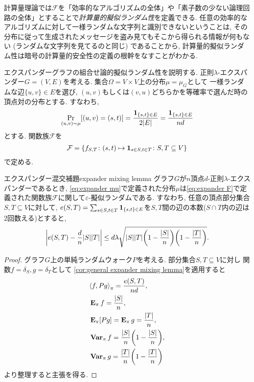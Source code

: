 計算量理論では$\mathcal{F}$を「効率的なアルゴリズムの全体」や「素子数の少ない論理回路の全体」とすることで\emph{計算量的擬似ランダム性}を定義できる.
任意の効率的なアルゴリズムに対して一様ランダムな文字列と識別できないということは, その分布に従って生成されたメッセージを盗み見てもそこから得られる情報が何もない (ランダムな文字列を見てるのと同じ) であることから, 計算量的擬似ランダム性は暗号の計算量的安全性の定義の根幹をなすことがわかる.

エクスパンダーグラフの組合せ論的擬似ランダム性を説明する.
正則$\lambda$-エクスパンダー$G=(V,E)$を考える.
集合$\Omega=V\times V$上の分布$\mu = \mu_G$として
一様ランダムな辺$\{u,v\}\in E$を選び, $(u,v)$もしくは$(v,u)$どちらかを等確率で選んだ時の頂点対の分布とする.
すなわち,
\begin{align}
    \Pr_{(u,v)\sim \mu}\sbra*{ (u,v) = (s,t)} = \frac{\indicator{\{s,t\}\in E}}{2\abs{E}} = \frac{\indicator{\{s,t\}\in E}}{nd} \label{eq:expander mu}
\end{align}
とする.
関数族$\mathcal{F}$を
\begin{align}
    \mathcal{F} = \cbra*{ f_{S,T} \colon (s,t) \mapsto \indicator{s\in S,t\in T} \colon S,T\subseteq V}  \label{eq:expander F}
\end{align}
で定める.
\begin{lemma}{エクスパンダー混交補題}{expander mixing lemma}
    グラフ$G$が$n$頂点$d$-正則$\lambda$-エクスパンダーであるとき, \cref{eq:expander mu}で定義された分布$\mu$は\cref{eq:expander F}で定義された関数族$\mathcal{F}$に関して$\varepsilon$-擬似ランダムである.
    すなわち, 任意の頂点部分集合$S,T\subseteq V$に対して,
    $e(S,T) = \sum_{s\in S,t\in T} \indicator{\{s,t\} \in E}$を$S,T$間の辺の本数($S\cap T$内の辺は2回数える)とすると,
    \[
        \abs*{e(S,T) - \frac{d}{n}|S||T|} \le d\lambda\sqrt{|S||T|\rbra*{1-\frac{|S|}{n}}\rbra*{1-\frac{|T|}{n}}}.
    \]
\end{lemma}
\begin{proof}
    グラフ$G$上の単純ランダムウォーク$P$を考える.
    部分集合$S,T\subseteq V$に対し
    関数$f=\delta_S,g=\delta_T$として
    \cref{cor:general expander mixing lemma}を適用すると
    \begin{align*}
        &\piprod{f,Pg} = \frac{e(S,T)}{nd}, \\
        &\Epi f = \frac{|S|}{n},\\
        &\Epi [Pg] = \Epi g = \frac{|T|}{n},\\
        &\Varpi f = \frac{|S|}{n}\rbra*{1-\frac{|S|}{n}}, \\
        &\Varpi g = \frac{|T|}{n}\rbra*{1-\frac{|T|}{n}}
    \end{align*}
    より整理すると主張を得る.
\end{proof}

